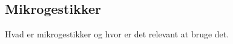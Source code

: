 \subsection{Mikrogestikker}
\label{Mikrogestikker}

Hvad er mikrogestikker og hvor er det relevant at bruge det. 